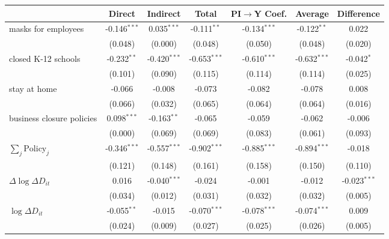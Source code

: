 
\begin{tabular}{lccccc|>{}c}
\toprule
  & Direct & Indirect & Total & PI$\to$Y Coef. & Average & Difference\\
\midrule
masks for employees & -0.146$^{***}$ & 0.035$^{***}$ & -0.111$^{**}$ & -0.134$^{***}$ & -0.122$^{**}$ & 0.022\\
 & (0.048) & (0.000) & (0.048) & (0.050) & (0.048) & (0.020)\\
closed K-12 schools & -0.232$^{**}$ & -0.420$^{***}$ & -0.653$^{***}$ & -0.610$^{***}$ & -0.632$^{***}$ & -0.042$^{*}$\\
 & (0.101) & (0.090) & (0.115) & (0.114) & (0.114) & (0.025)\\
stay at home & -0.066 & -0.008 & -0.073 & -0.082 & -0.078 & 0.008\\
 & (0.066) & (0.032) & (0.065) & (0.064) & (0.064) & (0.016)\\
business closure policies & 0.098$^{***}$ & -0.163$^{**}$ & -0.065 & -0.059 & -0.062 & -0.006\\
 & (0.000) & (0.069) & (0.069) & (0.083) & (0.061) & (0.093)\\
$\sum_j \mathrm{Policy}_j$ & -0.346$^{***}$ & -0.557$^{***}$ & -0.902$^{***}$ & -0.885$^{***}$ & -0.894$^{***}$ & -0.018\\
 & (0.121) & (0.148) & (0.161) & (0.158) & (0.150) & (0.110)\\
$\Delta \log \Delta D_{it}$ & 0.016 & -0.040$^{***}$ & -0.024 & -0.001 & -0.012 & -0.023$^{***}$\\
 & (0.034) & (0.012) & (0.031) & (0.032) & (0.032) & (0.005)\\
$\log \Delta D_{it}$ & -0.055$^{**}$ & -0.015 & -0.070$^{***}$ & -0.078$^{***}$ & -0.074$^{***}$ & 0.009\\
 & (0.024) & (0.009) & (0.027) & (0.025) & (0.026) & (0.005)\\
\bottomrule
\end{tabular}